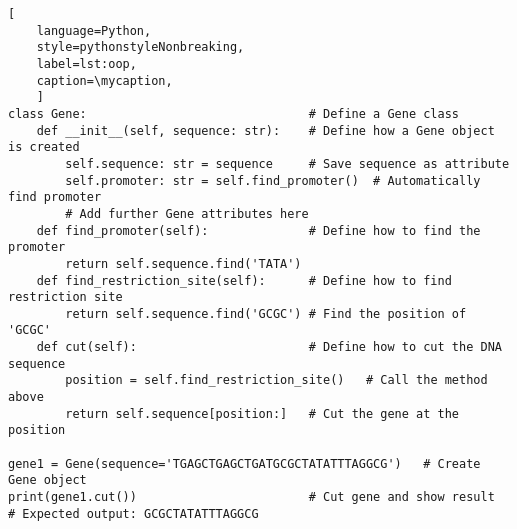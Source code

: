 



\def\mycaption{ Example of object oriented programming in Python. The class is
    called ``\texttt{Gene}'' and acts as a blueprint to create \texttt{Gene}
    objects. \texttt{Gene} has four methods, ``\texttt{\_\_init\_\_}'',
    ``\texttt{find\_promoter}'', ``\texttt{find\_restriction\_site}'' and
    ``\texttt{cut}''. The method ``\texttt{\_\_init\_\_}'' is called when
    creating (``initializing'') an object, which fills the object with
    user-defined data. The parameter ``\texttt{self}'' is a placeholder for the
    objects that are to be created. ``\texttt{find\_promoter}'' is a method that
    finds the position of the promoter in the gene and is called during object
    initialization. }
\begin{lstlisting}[
    language=Python,
    style=pythonstyleNonbreaking,
    label=lst:oop,
    caption=\mycaption,
    ]
class Gene:                               # Define a Gene class
    def __init__(self, sequence: str):    # Define how a Gene object is created
        self.sequence: str = sequence     # Save sequence as attribute
        self.promoter: str = self.find_promoter()  # Automatically find promoter
        # Add further Gene attributes here
    def find_promoter(self):              # Define how to find the promoter
        return self.sequence.find('TATA')
    def find_restriction_site(self):      # Define how to find restriction site
        return self.sequence.find('GCGC') # Find the position of 'GCGC'
    def cut(self):                        # Define how to cut the DNA sequence
        position = self.find_restriction_site()   # Call the method above
        return self.sequence[position:]   # Cut the gene at the position

gene1 = Gene(sequence='TGAGCTGAGCTGATGCGCTATATTTAGGCG')   # Create Gene object
print(gene1.cut())                        # Cut gene and show result 
# Expected output: GCGCTATATTTAGGCG
\end{lstlisting}



